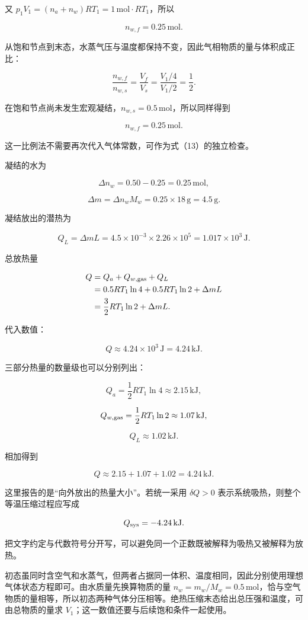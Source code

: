 \documentclass[12pt,a4paper,UTF8]{ctexart}
\begin{document}
又 \(p_1V_1=(n_a+n_w)RT_1=1\,\mathrm{mol}\cdot RT_1\)，所以

\[n_{w,f}=0.25\,\mathrm{mol}. \tag{13}\]

从饱和节点到末态，水蒸气压与温度都保持不变，因此气相物质的量与体积成正比：

\[\frac{n_{w,f}}{n_{w,s}}
=\frac{V_f}{V_s}
=\frac{V_1/4}{V_1/2}
=\frac12.\]

在饱和节点尚未发生宏观凝结，\(n_{w,s}=0.5\,\mathrm{mol}\)，所以同样得到

\[n_{w,f}=0.25\,\mathrm{mol}.\]

这一比例法不需要再次代入气体常数，可作为式（13）的独立检查。

凝结的水为

\[\Delta n_w=0.50-0.25=0.25\,\mathrm{mol},\]

\[\Delta m=\Delta n_wM_w
=0.25\times18\,\mathrm g=4.5\,\mathrm g. \tag{14}\]

凝结放出的潜热为

\[Q_L=\Delta mL
=4.5\times10^{-3}\times2.26\times10^5
=1.017\times10^3\,\mathrm J. \tag{15}\]

总放热量

\[\begin{aligned}
Q
&=Q_a+Q_{w,\rm gas}+Q_L\\
&=0.5RT_1\ln4+0.5RT_1\ln2+\Delta mL\\
&=\frac32RT_1\ln2+\Delta mL.
\end{aligned}\]

代入数值：

\[\boxed{Q\approx4.24\times10^3\,\mathrm J=4.24\,\mathrm{kJ}}. \tag{16}\]

三部分热量的数量级也可以分别列出：

\[Q_a=\frac12RT_1\ln4\approx2.15\,\mathrm{kJ},\]

\[Q_{w,\rm gas}=\frac12RT_1\ln2\approx1.07\,\mathrm{kJ},\]

\[Q_L\approx1.02\,\mathrm{kJ}.\]

相加得到

\[Q\approx2.15+1.07+1.02=4.24\,\mathrm{kJ}.\]

这里报告的是``向外放出的热量大小''。若统一采用 \(\delta Q>0\)
表示系统吸热，则整个等温压缩过程应写成

\[Q_{\rm sys}=-4.24\,\mathrm{kJ}.\]

把文字约定与代数符号分开写，可以避免同一个正数既被解释为吸热又被解释为放热。

初态虽同时含空气和水蒸气，但两者占据同一体积、温度相同，因此分别使用理想气体状态方程即可。由水质量先换算物质的量
\(n_w=m_w/M_w=0.5\,\mathrm{mol}\)，恰与空气物质的量相等，所以初态两种气体分压相等。绝热压缩末态给出总压强和温度，可由总物质的量求
\(V_1\)；这一数值还要与后续饱和条件一起使用。
\end{document}
